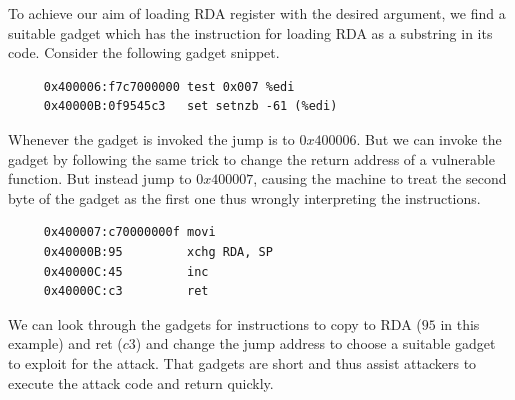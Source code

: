 \documentclass[11pt]{article} %
\begin{document}
To achieve our aim of loading RDA register with the desired argument, we find
a suitable gadget which has the instruction for loading RDA as a substring in
its code. Consider the following gadget snippet.

\begin{verbatim}
     0x400006:f7c7000000 test 0x007 %edi
     0x40000B:0f9545c3   set setnzb -61 (%edi)
\end{verbatim}

Whenever the gadget is invoked the jump is to $0x400006$. But we can invoke the
gadget by following the same trick to change the return address of a vulnerable
function. But instead jump to $0x400007$, causing the machine to treat the second
byte of the gadget as the first one thus wrongly interpreting the instructions.

\begin{verbatim}
     0x400007:c70000000f movi
     0x40000B:95         xchg RDA, SP
     0x40000C:45         inc
     0x40000C:c3         ret
\end{verbatim}

We can look through the gadgets for instructions to copy to RDA ($95$ in this
example) and ret ($c3$) and change the jump address to choose a suitable
gadget to exploit for the attack. That gadgets are short and thus assist attackers to
execute the attack code and return quickly.
\end{document}
